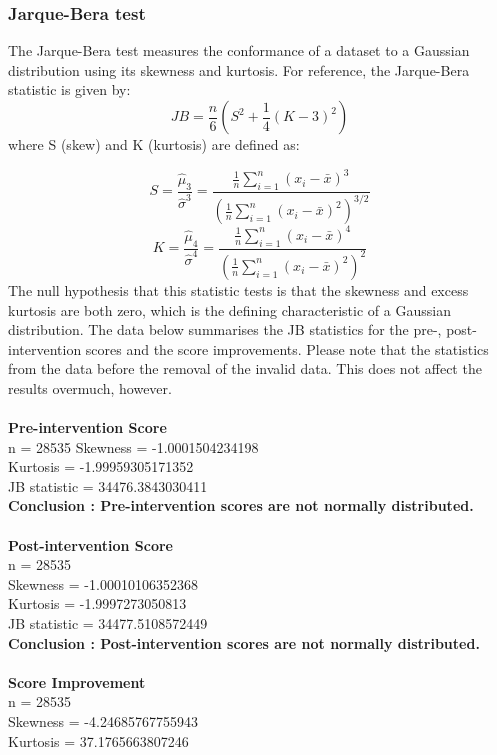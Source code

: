 \documentclass[10pt]{article}
\begin{document}
\subsubsection{Jarque-Bera test}
The Jarque-Bera test measures the conformance of a dataset to a Gaussian distribution using its skewness and kurtosis. For reference, the Jarque-Bera statistic is given by:\\

\[{JB}=\frac{n}{6} \left( S^2 + \frac14 (K-3)^2 \right)\]
where S (skew) and K (kurtosis) are defined as:

\[S = \frac{ \hat{\mu}_3 }{ \hat{\sigma}^3 } 
        = \frac{\frac1n \sum_{i=1}^n (x_i-\bar{x})^3} {\left(\frac1n \sum_{i=1}^n (x_i-\bar{x})^2 \right)^{3/2}}\]
\[
K = \frac{ \hat{\mu}_4 }{ \hat{\sigma}^4 }  
        = \frac{\frac1n \sum_{i=1}^n (x_i-\bar{x})^4} {\left(\frac1n \sum_{i=1}^n (x_i-\bar{x})^2 \right)^2}
\]
The null hypothesis that this statistic tests is that the skewness and excess kurtosis are both zero, which is the defining characteristic of a Gaussian distribution. The data below summarises the JB statistics for the pre-, post-intervention scores and the score improvements. Please note that the statistics from the data before the removal of the invalid data. This does not affect the results overmuch, however.\\\\
\textbf{Pre-intervention Score}\\
n = 28535
Skewness = -1.0001504234198\\
Kurtosis = -1.99959305171352\\
JB statistic = 34476.3843030411\\
\textbf{Conclusion : Pre-intervention scores are not normally distributed.}\\\\
\textbf{Post-intervention Score}\\
n = 28535\\
Skewness = -1.00010106352368\\
Kurtosis = -1.9997273050813\\
JB statistic = 34477.5108572449\\
\textbf{Conclusion : Post-intervention scores are not normally distributed.}\\\\
\textbf{Score Improvement}\\
n = 28535\\
Skewness = -4.24685767755943\\
Kurtosis = 37.1765663807246\\
\end{document}
